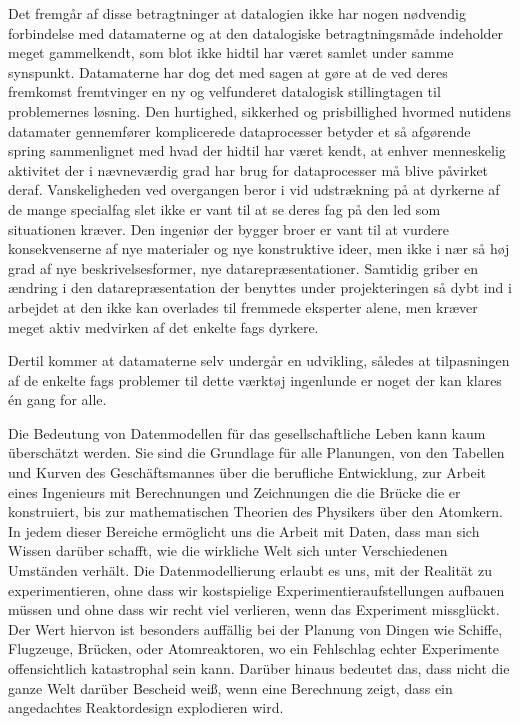 {Det fremgår af disse betragtninger at datalogien ikke har nogen nødvendig forbindelse med datamaterne og at den datalogiske betragtningsmåde indeholder meget gammelkendt, som blot ikke hidtil har været samlet under samme synspunkt. Datamaterne har dog det med sagen at gøre at de ved deres fremkomst fremtvinger en ny og velfunderet datalogisk stillingtagen til problemernes løsning. Den hurtighed, sikkerhed og prisbillighed hvormed nutidens datamater gennemfører komplicerede dataprocesser betyder et så afgørende spring sammenlignet med hvad der hidtil har været kendt, at enhver menneskelig aktivitet der i nævneværdig grad har brug for dataprocesser må blive påvirket deraf. Vanskeligheden ved overgangen beror i vid udstrækning på at dyrkerne af de mange specialfag slet ikke er vant til at se deres fag på den led som situationen kræver. Den ingeniør der bygger broer er vant til at vurdere konsekvenserne af nye materialer og nye konstruktive ideer, men ikke i nær så høj grad af nye beskrivelsesformer, nye datarepræsentationer. Samtidig griber en ændring i den datarepræsentation der benyttes under projekteringen så dybt ind i arbejdet at den ikke kan overlades til fremmede eksperter alene, men kræver meget aktiv medvirken af det enkelte fags dyrkere. 

Dertil kommer at datamaterne selv undergår en udvikling, således at tilpasningen af de enkelte fags problemer til dette værktøj ingenlunde er noget der kan klares én gang for alle.
}{
Die Bedeutung von Datenmodellen für das gesellschaftliche Leben kann kaum überschätzt werden. Sie sind die Grundlage für alle Planungen, von den Tabellen und Kurven des Geschäftsmannes über die berufliche Entwicklung, zur Arbeit eines Ingenieurs mit Berechnungen und Zeichnungen die die Brücke die er konstruiert, bis zur mathematischen Theorien des Physikers über den Atomkern. In jedem dieser Bereiche ermöglicht uns die Arbeit mit Daten, dass man sich Wissen darüber schafft, wie die wirkliche Welt sich unter Verschiedenen Umständen verhält. Die Datenmodellierung erlaubt es uns, mit der Realität zu experimentieren, ohne dass wir kostspielige Experimentieraufstellungen aufbauen müssen und ohne dass wir recht viel verlieren, wenn das Experiment missglückt. Der Wert hiervon ist besonders auffällig bei der Planung von Dingen wie Schiffe, Flugzeuge, Brücken, oder Atomreaktoren, wo ein Fehlschlag echter Experimente offensichtlich katastrophal sein kann. Darüber hinaus bedeutet das, dass nicht die ganze Welt darüber Bescheid weiß, wenn eine Berechnung zeigt, dass ein angedachtes Reaktordesign explodieren wird. 

}
